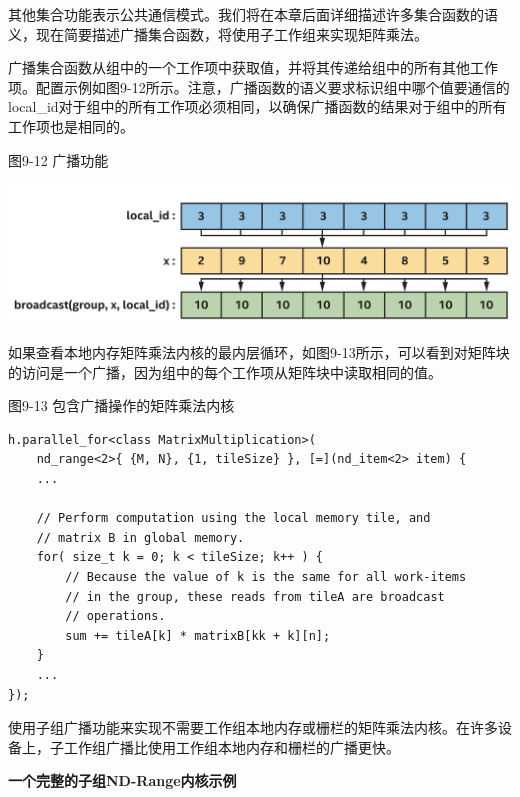 其他集合功能表示公共通信模式。我们将在本章后面详细描述许多集合函数的语义，现在简要描述广播集合函数，将使用子工作组来实现矩阵乘法。\par

广播集合函数从组中的一个工作项中获取值，并将其传递给组中的所有其他工作项。配置示例如图9-12所示。注意，广播函数的语义要求标识组中哪个值要通信的local\_id对于组中的所有工作项必须相同，以确保广播函数的结果对于组中的所有工作项也是相同的。\par

\hspace*{\fill} \par %
图9-12 广播功能
\begin{center}
	\includegraphics[width=1.\textwidth]{content/chapter-9/images/7}
\end{center}

如果查看本地内存矩阵乘法内核的最内层循环，如图9-13所示，可以看到对矩阵块的访问是一个广播，因为组中的每个工作项从矩阵块中读取相同的值。\par

\hspace*{\fill} \par %
图9-13 包含广播操作的矩阵乘法内核
\begin{lstlisting}[caption={}]
h.parallel_for<class MatrixMultiplication>(
	nd_range<2>{ {M, N}, {1, tileSize} }, [=](nd_item<2> item) {
	...
	
	// Perform computation using the local memory tile, and
	// matrix B in global memory.
	for( size_t k = 0; k < tileSize; k++ ) {
		// Because the value of k is the same for all work-items
		// in the group, these reads from tileA are broadcast
		// operations.
		sum += tileA[k] * matrixB[kk + k][n];
	}
	...
});
\end{lstlisting}

使用子组广播功能来实现不需要工作组本地内存或栅栏的矩阵乘法内核。在许多设备上，子工作组广播比使用工作组本地内存和栅栏的广播更快。\par

\hspace*{\fill} \par %
\textbf{一个完整的子组ND-Range内核示例}

